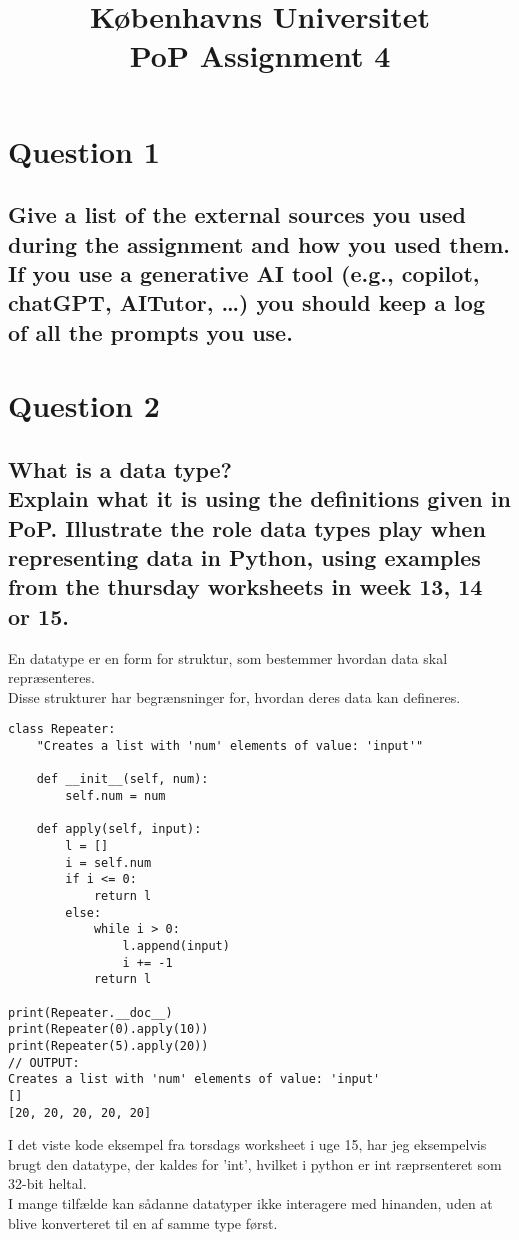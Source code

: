 \documentclass[a4paper,12pt]{article}
\begin{document}
% 

\title{Københavns Universitet\\
PoP Assignment 4}
\maketitle %

\section{Question 1}

\subsection{Give a list of the external sources you used during the assignment and how you used them.
If you use a generative AI tool (e.g., copilot, chatGPT, AITutor, \ldots) you should keep a log of all the prompts you use.}

\section{Question 2}

\subsection{What is a data type?\\
Explain what it is using the definitions given in PoP.
Illustrate the role data types play when representing data in Python, using examples from the thursday worksheets in week 13, 14 or 15.}

En datatype er en form for struktur, som bestemmer hvordan data skal repræsenteres.\\
Disse strukturer har begrænsninger for, hvordan deres data kan defineres.\\
\begin{lstlisting}
class Repeater:
    "Creates a list with 'num' elements of value: 'input'"

    def __init__(self, num):
        self.num = num
    
    def apply(self, input):
        l = []
        i = self.num
        if i <= 0:
            return l
        else:
            while i > 0:
                l.append(input)
                i += -1
            return l

print(Repeater.__doc__)
print(Repeater(0).apply(10))
print(Repeater(5).apply(20))
// OUTPUT:
Creates a list with 'num' elements of value: 'input'
[]
[20, 20, 20, 20, 20]
\end{lstlisting}
I det viste kode eksempel fra torsdags worksheet i uge 15, har jeg eksempelvis brugt den datatype, der kaldes for 'int', hvilket i python er int ræprsenteret som 32-bit heltal.\\
I mange tilfælde kan sådanne datatyper ikke interagere med hinanden, uden at blive konverteret til en af samme type først.
\end{document}
